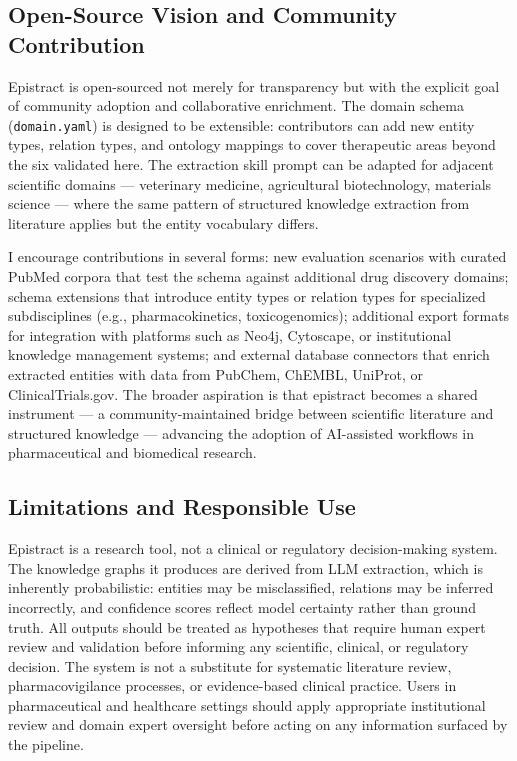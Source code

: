\subsection{Open-Source Vision and Community Contribution}

Epistract is open-sourced not merely for transparency but with the explicit goal of community adoption and collaborative enrichment. The domain schema (\texttt{domain.yaml}) is designed to be extensible: contributors can add new entity types, relation types, and ontology mappings to cover therapeutic areas beyond the six validated here. The extraction skill prompt can be adapted for adjacent scientific domains --- veterinary medicine, agricultural biotechnology, materials science --- where the same pattern of structured knowledge extraction from literature applies but the entity vocabulary differs.

I encourage contributions in several forms: new evaluation scenarios with curated PubMed corpora that test the schema against additional drug discovery domains; schema extensions that introduce entity types or relation types for specialized subdisciplines (e.g., pharmacokinetics, toxicogenomics); additional export formats for integration with platforms such as Neo4j, Cytoscape, or institutional knowledge management systems; and external database connectors that enrich extracted entities with data from PubChem, ChEMBL, UniProt, or ClinicalTrials.gov. The broader aspiration is that epistract becomes a shared instrument --- a community-maintained bridge between scientific literature and structured knowledge --- advancing the adoption of AI-assisted workflows in pharmaceutical and biomedical research.

\subsection{Limitations and Responsible Use}

Epistract is a research tool, not a clinical or regulatory decision-making system. The knowledge graphs it produces are derived from LLM extraction, which is inherently probabilistic: entities may be misclassified, relations may be inferred incorrectly, and confidence scores reflect model certainty rather than ground truth. All outputs should be treated as hypotheses that require human expert review and validation before informing any scientific, clinical, or regulatory decision. The system is not a substitute for systematic literature review, pharmacovigilance processes, or evidence-based clinical practice. Users in pharmaceutical and healthcare settings should apply appropriate institutional review and domain expert oversight before acting on any information surfaced by the pipeline.
